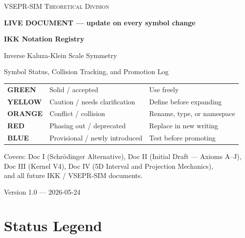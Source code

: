 \documentclass[11pt, a4paper, oneside]{article}
\newcommand{\GRN}{\colorbox{GreenBG}{\textcolor{GreenFG}{\small\bfseries GREEN}}}
\newcommand{\YEL}{\colorbox{YellowBG}{\textcolor{YellowFG}{\small\bfseries YELLOW}}}
\newcommand{\ORG}{\colorbox{OrangeBG}{\textcolor{OrangeFG}{\small\bfseries ORANGE}}}
\newcommand{\RED}{\colorbox{RedBG}{\textcolor{RedFG}{\small\bfseries RED}}}
\newcommand{\BLU}{\colorbox{BlueBG}{\textcolor{BlueFG}{\small\bfseries BLUE}}}
\begin{document}
\begin{titlepage}
  \centering
  \vspace*{1.5cm}
  {\large\scshape VSEPR-SIM Theoretical Division\par}
  \vspace{0.3cm}
  {\small\bfseries LIVE DOCUMENT --- update on every symbol change\par}
  \vspace{1.2cm}
  {\Huge\bfseries IKK Notation Registry\par}
  \vspace{0.5cm}
  {\LARGE Inverse Kaluza-Klein Scale Symmetry\par}
  \vspace{0.4cm}
  {\large Symbol Status, Collision Tracking, and Promotion Log\par}
  \vspace{1.4cm}
  \begin{tabular}{l l l}
    \GRN & Solid / accepted & Use freely \\[4pt]
    \YEL & Caution / needs clarification & Define before expanding \\[4pt]
    \ORG & Conflict / collision & Rename, type, or namespace \\[4pt]
    \RED & Phasing out / deprecated & Replace in new writing \\[4pt]
    \BLU & Provisional / newly introduced & Test before promoting \\
  \end{tabular}
  \vspace{1.4cm}

  {\normalsize
    Covers: Doc I (Schr\"{o}dinger Alternative),
    Doc II (Initial Draft --- Axioms A--J),\\[0.3em]
    Doc III (Kernel V4),
    Doc IV (5D Interval and Projection Mechanics),\\[0.3em]
    and all future IKK / VSEPR-SIM documents.
  \par}
  \vspace{1.5cm}
  {\normalsize Version 1.0 --- 2026-05-24\par}
\end{titlepage}

\tableofcontents
\newpage

\section{Status Legend}
\label{sec:legend}
\end{document}
